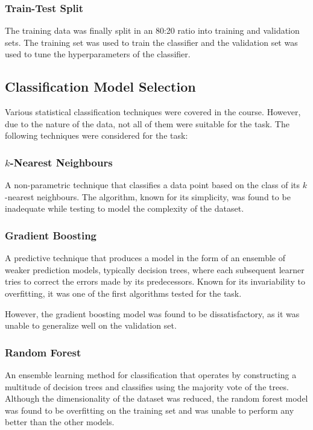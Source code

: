 \documentclass[conference]{IEEEtran}
\begin{document}
    \subsubsection{Train-Test Split}
    The training data was finally split in an 80:20 ratio into training and validation sets.
    The training set was used to train the classifier and the validation set was used to tune the hyperparameters of the classifier.

    \subsection{Classification Model Selection}
    \label{sec:modelselection}
    Various statistical classification techniques were covered in the course.
    However, due to the nature of the data, not all of them were suitable for the task.
    The following techniques were considered for the task:

    \subsubsection{$k$-Nearest Neighbours}
    \label{sec:knn}
    A non-parametric technique that classifies a data point based on the class of its $k$-nearest neighbours.
    The algorithm, known for its simplicity, was found to be inadequate while testing to model the complexity of the dataset.

    \subsubsection{Gradient Boosting}
    \label{sec:gb}
    A predictive technique that produces a model in the form of an ensemble of weaker prediction models, typically decision trees,
    where each subsequent learner tries to correct the errors made by its predecessors.
    Known for its invariability to overfitting, it was one of the first algorithms tested for the task.

    However, the gradient boosting model was found to be dissatisfactory, as it was unable to generalize well on the validation set.

    \subsubsection{Random Forest}
    \label{sec:rf}
    An ensemble learning method for classification that operates by constructing a multitude of decision trees and classifies using the majority vote of the trees.
    Although the dimensionality of the dataset was reduced, the random forest model was found to be overfitting on the training set
    and was unable to perform any better than the other models.
\end{document}
